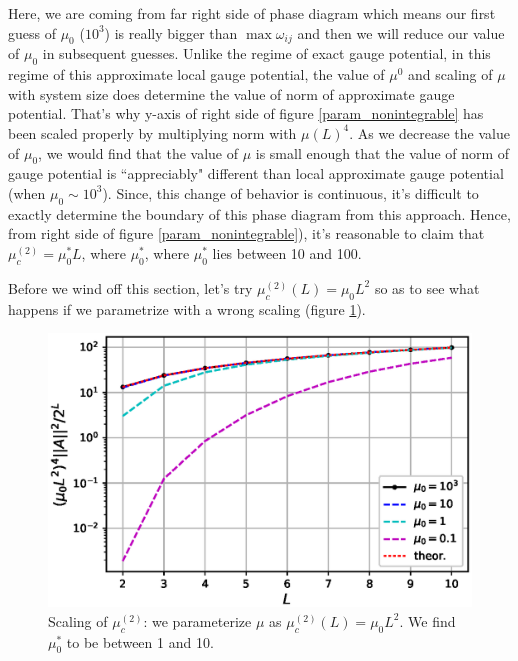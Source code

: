 \documentclass[11pt,a4paper]{article}
\begin{document}
Here, we are coming from far right side of phase diagram which means our first guess of $\mu_0$ ($10^3$) is really bigger than $\max{\omega_{ij}}$ and then we will reduce our value of $\mu_0$ in subsequent guesses. Unlike the regime of exact gauge potential, in this regime of this approximate local gauge potential, the value of $\mu^0$ and scaling of $\mu$ with system size does determine the value of norm of approximate gauge potential. That's why y-axis of right side of figure \ref{param_nonintegrable} has been scaled properly by multiplying norm with $\mu(L)^4$. As we decrease the value of $\mu_0$, we would find that the value of $\mu$ is small enough that the value of norm of gauge potential is ``appreciably" different than local approximate gauge potential (when $\mu_0 \sim 10^3$). Since, this change of behavior is continuous, it's difficult to exactly determine the boundary of this phase diagram from this approach. Hence, from right side of figure \ref{param_nonintegrable}), it's reasonable to claim that $\mu_c^{(2)}= \mu_0^*L$, where $\mu_0^*$, where $\mu_0^*$ lies between 10 and 100.

Before we wind off this section, let's try $\mu_c^{(2)}(L) =\mu_0 L^2$ so as to see what happens if we parametrize with a wrong scaling (figure \ref{param2_nonintegrable}). 


\begin{figure}[!ht]
\begin{center}
\includegraphics[scale=0.51]{new_pics/scaling_mu_c_2_quad_scaling.eps}
\caption{Scaling of  $\mu_c^{(2)}$: we parameterize $\mu$ as $\mu_c^{(2)}(L)= \mu_0 L^2$. We find $\mu_0^*$ to be between 1 and 10.  }
\label{param2_nonintegrable}
\end{center}
\end{figure}
\end{document}
